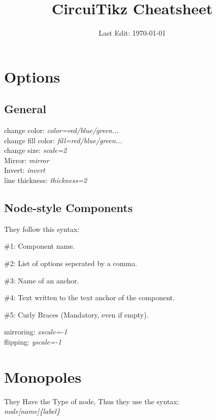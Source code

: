 \documentclass{article}
\title{CircuiTikz Cheatsheet}
\date{Last Edit: \today}
\begin{document}
\maketitle

    \section{Options}

    \subsection{General}
        \begin{center}
            change color: \textit{color=red/blue/green...} \\
            change fill color: \textit{fill=red/blue/green...} \\
            change size: \textit{scale=2}\\
            Mirror: \textit{mirror}\\
            Invert: \textit{invert}\\
            line thickness: \textit{thickness=2}
        \end{center}
    \subsection{Node-style Components}
    They follow this syntax: 
    
    \#1: Component name.
    
    \#2: List of options seperated by a comma.
    
    \#3: Name of an anchor.
    
    \#4: Text written to the text anchor of the component.
    
    \#5: Curly Braces (Mandatory, even if empty).
        \begin{center}
            mirroring: \textit{xscale=-1}\\
            flipping: \textit{yscale=-1}
        \end{center}

        



    \newpage
    \section{Monopoles}
    They Have the Type of node, Thus they use the syntax:\\
    \centering
        \textit{node[name]\{label\}} \\
    \raggedright
\end{document}
